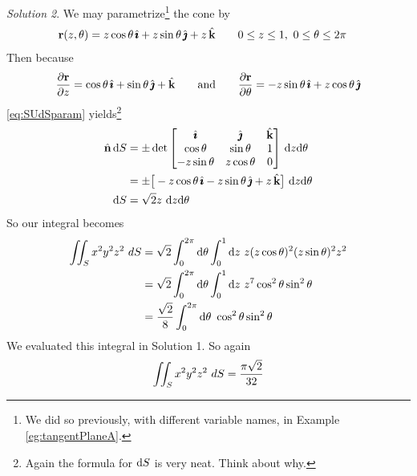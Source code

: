 \begin{eg}
\medskip
\noindent\textit{Solution 2}.
We may parametrize\footnote{We did so previously, with different variable names, in Example \ref{eg:tangentPlaneA}.} the cone by
\begin{align*}
\mathbf{r}(z,\theta) &= z\cos\theta\,\hat{\pmb{\imath}} +  z\sin\theta\,\hat{\pmb{\jmath}} + z\,\hat{\mathbf{k}} \qquad
0\le z\le 1,\ 0\le\theta\le 2\pi
\end{align*}
Then because
\begin{align*}
\frac{\partial\mathbf{r}}{\partial z}
   =  \cos\theta\,\hat{\pmb{\imath}} +  \sin\theta\,\hat{\pmb{\jmath}} + \hat{\mathbf{k}} \qquad\text{and}\qquad
\frac{\partial\mathbf{r}}{\partial\theta}
   =  -z\sin\theta\,\hat{\pmb{\imath}} +  z\cos\theta\,\hat{\pmb{\jmath}} 
\end{align*}
\eqref{eq:SUdSparam} yields\footnote{Again the formula for $\mathrm{d}S$ is
   very neat. Think about why.}
\begin{align*}
\hn\,\dee{S}
&=\pm\det\left[\begin{matrix}
                   \hi & \hj & \hk \\
                   \cos\theta & \sin\theta & 1 \\
                   -z\sin\theta & z\cos\theta & 0
                \end{matrix}\right]\,\dee{z}\dee{\theta} \\
&=\pm\big[-z\cos\theta\,\hi - z\sin\theta\,\hj + z\,\hk\big]\ 
          \dee{z}\dee{\theta} \\
\dee{S}&= \sqrt{2} z\ \dee{z}\dee{\theta}
\end{align*}
So our integral becomes
\begin{align*}
\dblInt_S x^2y^2z^2\ dS 
&= \sqrt{2}\int_0^{2\pi}\dee{\theta} \int_0^1\dee{z}\ 
           z (z\cos\theta)^2 (z\sin\theta)^2 z^2 \\
&= \sqrt{2}\int_0^{2\pi}\dee{\theta} \int_0^1\dee{z}\ z^7
           \cos^2\theta \sin^2\theta \\
&=\frac{\sqrt{2}}{8} \int_0^{2\pi}\dee{\theta}\ 
          \cos^2\theta \sin^2\theta 
\end{align*} 
We evaluated this integral in Solution 1. So again
\begin{equation*}
\dblInt_S x^2y^2z^2\ dS   =\frac{\pi\sqrt{2}}{32} 
\end{equation*}
\end{eg}

